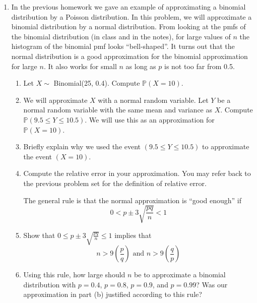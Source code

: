 \documentclass[12pt]{article}
\def\P{{\mathbb P}}
\begin{document}
\begin{enumerate}
\begin{enumerate}
\end{enumerate}

\item In the previous homework we gave an example of approximating a binomial distribution by a Poisson distribution. In this problem, we will approximate a binomial distribution by a normal distribution. From looking at the pmfs of the binomial distribution (in class and in the notes), for large values of $n$ the histogram of the binomial pmf looks ``bell-shaped''. It turns out that the normal distribution is a good approximation for the binomial approximation for large $n$. It also works for small $n$ as long as $p$ is not too far from 0.5.\\

\begin{enumerate}
\item Let $X \sim$ Binomial(25, 0.4). Compute $\P(X = 10)$.
\item We will approximate $X$ with a normal random variable. Let $Y$ be a normal random variable with the same mean and variance as $X$. Compute $\P(9.5 \leq Y \leq 10.5)$. We will use this as an approximation for $\P(X = 10)$.
\item Briefly explain why we used the event $(9.5 \leq Y \leq 10.5)$ to approximate the event $(X = 10)$.
\item Compute the relative error in your approximation. You may refer back to the previous problem set for the definition of relative error.

The general rule is that the normal approximation is ``good enough'' if
\[
0 < p \pm 3 \sqrt{\frac{pq}{n}} < 1
\]

\item Show that $0 \leq p \pm 3 \sqrt{\frac{pq}{n}} \leq 1$ implies that
\[
n > 9\left( \frac{p}{q} \right) \text{ and } n > 9\left( \frac{q}{p} \right)
\]

\item Using this rule, how large should $n$ be to approximate a binomial distribution with $p = 0.4$, $p = 0.8$, $p = 0.9$, and $p = 0.99$? Was our approximation in part (b) justified according to this rule?

\end{enumerate}

\end{enumerate}
\end{document}
